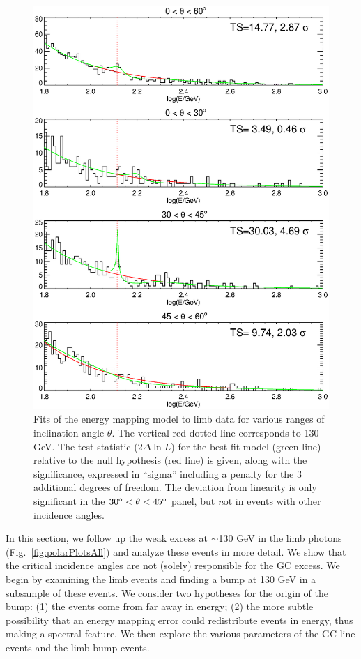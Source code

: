 \documentclass[aps,twocolumn,prd,superscriptaddress,showpacs,nofootinbib,fixfloat]{revtex4}
\newcommand{\degree}{^{\rm o}}
\begin{document}
\begin{figure}
  \centering
  \includegraphics[width=1.0\linewidth]{plots/limbfits.ps}
  \caption{Fits of the energy mapping model to limb data for
  various ranges of inclination angle $\theta$.  The
  vertical red dotted line corresponds to 130 GeV.  The test
  statistic ($2\Delta\ln L$) for the best fit model (green
  line) relative to the null hypothesis (red line) is given,
  along with the significance, expressed in ``sigma''
  including a penalty for the 3 additional degrees of
  freedom.  The deviation from linearity is only significant
  in the $30\degree < \theta < 45\degree$ panel, but {\emph not} in events with other incidence angles.}
  \label{fig:limbfits}
\end{figure}



In this section, we follow up the weak excess at $\sim$130 GeV 
in the limb photons
(Fig.~\ref{fig:polarPlotsAll})
and
analyze these events in more detail. We show that the
critical incidence angles are not (solely) responsible for
the GC excess.
We begin by examining the limb events and finding a bump at
130 GeV in a subsample of these events.  We consider two
hypotheses for the origin of the bump: (1) the events come
from far away in energy; (2) the more subtle possibility
that an energy mapping error could redistribute events in energy,
thus making a spectral feature.  We then explore the various
parameters of the GC line events and the limb bump events.
\end{document}
